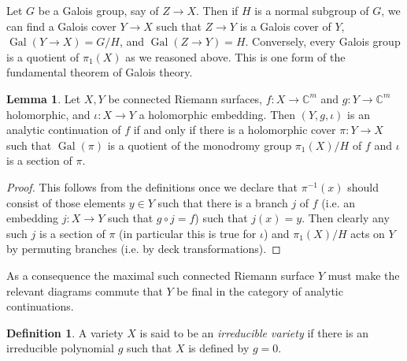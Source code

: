 \documentclass[12pt]{report}
\newcommand{\CC}{\mathbb{C}}
\DeclareMathOperator{\Gal}{Gal}
\newcommand{\dfn}[1]{\emph{#1}\index{#1}}
\theoremstyle{definition}
\newtheorem{lemma}[theorem]{Lemma}
\newtheorem{definition}[theorem]{Definition}
\begin{document}
Let $G$ be a Galois group, say of $Z \to X$. Then if $H$ is a normal subgroup of $G$, we can find a Galois cover $Y \to X$ such that $Z \to Y$ is a Galois cover of $Y$, $\Gal(Y \to X) = G/H$, and $\Gal(Z \to Y) = H$.
Conversely, every Galois group is a quotient of $\pi_1(X)$ as we reasoned above.
This is one form of the fundamental theorem of Galois theory.

\begin{lemma}
Let $X,Y$ be connected Riemann surfaces, $f: X \to \CC^m$ and $g: Y \to \CC^m$ holomorphic, and $\iota: X \to Y$ a holomorphic embedding.
Then $(Y, g, \iota)$ is an analytic continuation of $f$ if and only if there is a holomorphic cover $\pi: Y \to X$ such that $\Gal(\pi)$ is a quotient of the monodromy group $\pi_1(X)/H$ of $f$ and $\iota$ is a section of $\pi$.
\end{lemma}
\begin{proof}
This follows from the definitions once we declare that $\pi^{-1}(x)$ should consist of those elements $y \in Y$ such that there is a branch $j$ of $f$ (i.e. an embedding $j: X \to Y$ such that $g \circ j = f$) such that $j(x) = y$.
Then clearly any such $j$ is a section of $\pi$ (in particular this is true for $\iota$) and $\pi_1(X)/H$ acts on $Y$ by permuting branches (i.e. by deck transformations).
\end{proof}
As a consequence the maximal such connected Riemann surface $Y$ must make the relevant diagrams commute that $Y$ be final in the category of analytic continuations.

\begin{definition}
A variety $X$ is said to be an \dfn{irreducible variety} if there is an irreducible polynomial $g$ such that $X$ is defined by $g = 0$.
\end{definition}
\end{document}
